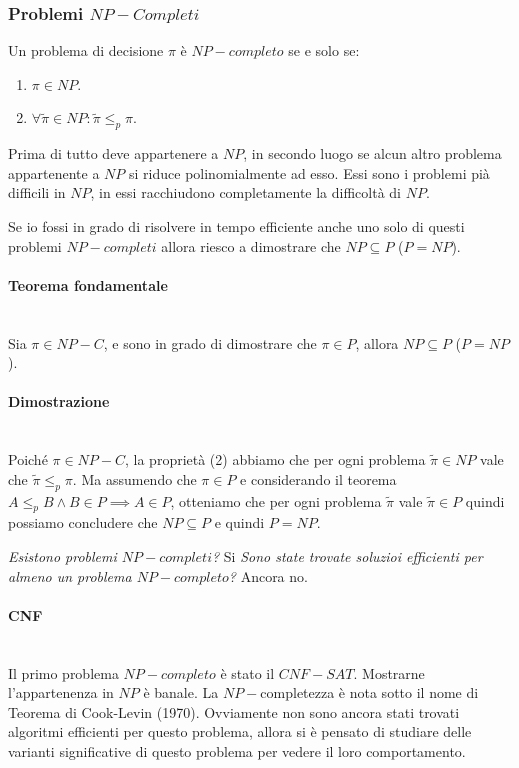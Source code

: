 \documentclass{article}
\begin{document}
\subsubsection{Problemi $NP-Completi$}
Un problema di decisione $\pi$ è $NP-completo$ se e solo se:
\begin{enumerate}
    \item $\pi\in NP$.
    \item $\forall\tilde{\pi}\in NP:\tilde{\pi}\leq_p\pi$.
\end{enumerate}
Prima di tutto deve appartenere a $NP$, in secondo luogo se alcun altro problema appartenente
a $NP$ si riduce polinomialmente ad esso.
Essi sono i problemi pià difficili in $NP$, in essi racchiudono completamente la difficoltà
di $NP$.

Se io fossi in grado di risolvere in tempo efficiente anche uno solo di questi problemi
$NP-completi$ allora riesco a dimostrare che $NP\subseteq P$ ($P=NP$).

\paragraph{Teorema fondamentale}\mbox{}\\
Sia $\pi\in NP-C$, e sono in grado di dimostrare che $\pi\in P$, allora $NP\subseteq P$ ($P=NP$).

\paragraph{Dimostrazione}\mbox{}\\
Poiché $\pi\in NP-C$, la proprietà (2) abbiamo che per ogni problema $\tilde{\pi}\in NP$
vale che $\tilde{\pi}\leq_p\pi$. Ma assumendo che $\pi\in P$ e considerando il teorema
$A\leq_p B\land B\in P\implies A\in P$, otteniamo che per ogni problema $\tilde{\pi}$
vale $\tilde{\pi}\in P$ quindi possiamo concludere che $NP\subseteq P$ e quindi $P=NP$.

\textit{Esistono problemi $NP-completi$?} Si \textit{Sono state trovate soluzioi
efficienti per almeno un problema $NP-completo$?} Ancora no.

\paragraph{CNF}\mbox{}\\
Il primo problema $NP-completo$ è stato il $CNF-SAT$. Mostrarne l'appartenenza in $NP$
è banale. La $NP-$completezza è nota sotto il nome di Teorema di Cook-Levin (1970).
Ovviamente non sono ancora stati trovati algoritmi efficienti per questo problema,
allora si è pensato di studiare delle varianti significative di questo problema
per vedere il loro comportamento.
\end{document}
